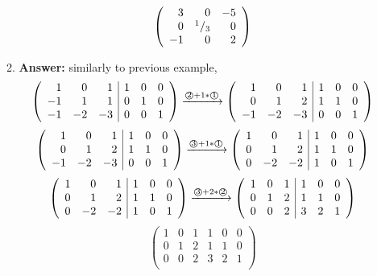 \documentclass[8pt]{article} %
\begin{document}
\begin{enumerate}[1]
\begin{enumerate}[\bf(a)]
\[\left(\begin{array}{rrr}
3&0&-5\\
0&{^{1}/_{3}}&0\\
-1&0&2\\
\end{array}\right)
\]
			\setcounter{enumi}{7}
		\item {\bf Answer: }similarly to previous example,
\[\left(\begin{array}{rrr|rrr}
1&0&1&1&0&0\\
-1&1&1&0&1&0\\
-1&-2&-3&0&0&1\\
\end{array}\right)
\xrightarrow{\text{\textcircled{2}$+1*$\textcircled{1}}}\left(\begin{array}{rrr|rrr}
1&0&1&1&0&0\\
0&1&2&1&1&0\\
-1&-2&-3&0&0&1\\
\end{array}\right)
\]\[\left(\begin{array}{rrr|rrr}
1&0&1&1&0&0\\
0&1&2&1&1&0\\
-1&-2&-3&0&0&1\\
\end{array}\right)
\xrightarrow{\text{\textcircled{3}$+1*$\textcircled{1}}}\left(\begin{array}{rrr|rrr}
1&0&1&1&0&0\\
0&1&2&1&1&0\\
0&-2&-2&1&0&1\\
\end{array}\right)
\]\[\left(\begin{array}{rrr|rrr}
1&0&1&1&0&0\\
0&1&2&1&1&0\\
0&-2&-2&1&0&1\\
\end{array}\right)
\xrightarrow{\text{\textcircled{3}$+2*$\textcircled{2}}}\left(\begin{array}{rrr|rrr}
1&0&1&1&0&0\\
0&1&2&1&1&0\\
0&0&2&3&2&1\\
\end{array}\right)
\]\[\left(\begin{array}{rrr|rrr}
1&0&1&1&0&0\\
0&1&2&1&1&0\\
0&0&2&3&2&1\\
\end{array}\right)
\]
\end{enumerate}
\end{enumerate}
\end{document}
